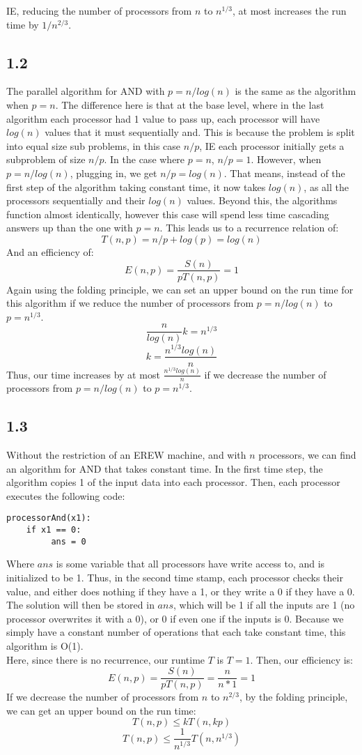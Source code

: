 \documentclass[letterpaper,notitlepage,twoside]{article}
\begin{document}
IE, reducing the number of processors from $n$ to $n^{1/3}$, at most increases the run time by $1/n^{2/3}$. 
\subsection*{1.2}
The parallel algorithm for AND with $p=n/log(n)$ is the same as the algorithm when $p=n$. The difference here is that at the base level, where in the last algorithm each processor had 1 value to pass up, each processor will have $log(n)$ values that it must sequentially and. This is because the problem is split into equal size sub problems, in this case $n/p$, IE each processor initially gets a subproblem of size $n/p$. In the case where $p=n$, $n/p = 1$. However, when $p=n/log(n)$, plugging in, we get $n/p = log(n)$. That means, instead of the first step of the algorithm taking constant time, it now takes $log(n)$, as all the processors sequentially and their $log(n)$ values. Beyond this, the algorithms function almost identically, however this case will spend less time cascading answers up than the one with $p=n$. This leads us to a recurrence relation of:
$$T(n, p) = n/p + log(p) = log(n)$$
And an efficiency of:
$$ E(n, p) = \frac{S(n)}{pT(n, p)} = 1$$ 
Again using the folding principle, we can set an upper bound on the run time for this algorithm if we reduce the number of processors from $p=n/log(n)$ to $p=n^{1/3}$.
$$\frac{n}{log(n)}k = n^{1/3}$$
$$k = \frac{n^{1/3}log(n)}{n}$$
Thus, our time increases by at most $\frac{n^{1/3}log(n)}{n}$ if we decrease the number of processors from $p=n/log(n)$ to $p=n^{1/3}$.
\subsection*{1.3}
Without the restriction of an EREW machine, and with $n$ processors, we can find an algorithm for AND that takes constant time. In the first time step, the algorithm copies 1 of the input data into each processor. Then, each processor executes the following code:
\begin{verbatim}
processorAnd(x1):
    if x1 == 0:
         ans = 0 
\end{verbatim}
Where $ans$ is some variable that all processors have write access to, and is initialized to be 1. Thus, in the second time stamp, each processor checks their value, and either does nothing if they have a 1, or they write a 0 if they have a 0. The solution will then be stored in $ans$, which will be 1 if all the inputs are 1 (no processor overwrites it with a 0), or 0 if even one if the inputs is 0. Because we simply have a constant number of operations that each take constant time, this algorithm is O(1). \\
Here, since there is no recurrence, our runtime $T$ is $T=1$. Then, our efficiency is:
$$ E(n, p) = \frac{S(n)}{pT(n, p)} = \frac{n}{n*1} = 1$$ 
If we decrease the number of processors from $n$ to $n^{2/3}$, by the folding principle, we can get an upper bound on the run time:
$$T(n, p) \leq kT(n, kp)$$ 
$$T(n, p) \leq \frac{1}{n^{1/3}} T(n, n^{1/3})$$
\end{document}
